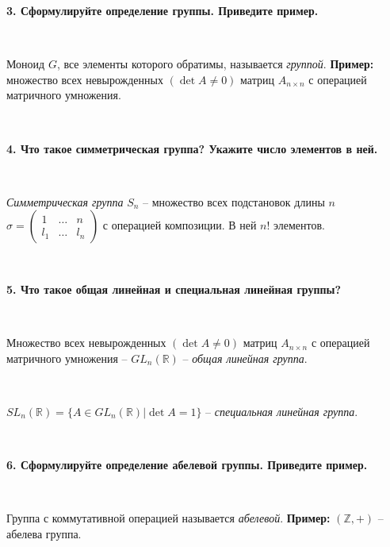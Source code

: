\documentclass{article}
\begin{document}
    \textbf{3. Сформулируйте определение группы. Приведите пример.}

    {
        $\;$
        \setlength{\parindent}{0.4cm}
        \hangindent=0.4cm

    Моноид $G$, все элементы которого обратимы, называется \textit{группой}. \textbf{Пример:} множество всех невырожденных $(\det A\ne 0)$ матриц $A_{n\times n}$ с операцией матричного умножения.

        $\;$
        \setlength{\parindent}{0cm}
        \hangindent=0cm
    }

    \textbf{4. Что такое симметрическая группа? Укажите число элементов в ней.}

    {
        $\;$
        \setlength{\parindent}{0.4cm}
        \hangindent=0.4cm

    \textit{Симметрическая группа} $S_n$ -- множество всех подстановок длины $n$ {\scriptsize $\sigma=\begin{pmatrix}
                                                                                                          1   & \ldots & n   \\
                                                                                                          l_1 & \ldots & l_n
    \end{pmatrix}$} с операцией композиции. В ней $n!$ элементов.

        $\;$
        \setlength{\parindent}{0cm}
        \hangindent=0cm
    }

    \newpage

    \textbf{5. Что такое общая линейная и специальная линейная группы?}

    {
        $\;$
        \setlength{\parindent}{0.4cm}
        \hangindent=0.4cm

    Множество всех невырожденных $(\det A\ne 0)$ матриц $A_{n\times n}$ с операцией матричного умножения -- $GL_n(\mathbb{R})$ -- \textit{общая линейная группа}.

        $\;$

        $SL_n(\mathbb{R})=\{A\in GL_n(\mathbb{R})|\det A=1 \}$ -- \textit{специальная линейная группа}.

        $\;$
        \setlength{\parindent}{0cm}
        \hangindent=0cm
    }

    \textbf{6. Сформулируйте определение абелевой группы. Приведите пример.}

    {
        $\;$
        \setlength{\parindent}{0.4cm}
        \hangindent=0.4cm

    Группа с коммутативной операцией называется \textit{абелевой}. \textbf{Пример:} $(\mathbb{Z}, +)$ -- абелева группа.

        $\;$
        \setlength{\parindent}{0cm}
        \hangindent=0cm
    }
\end{document}
